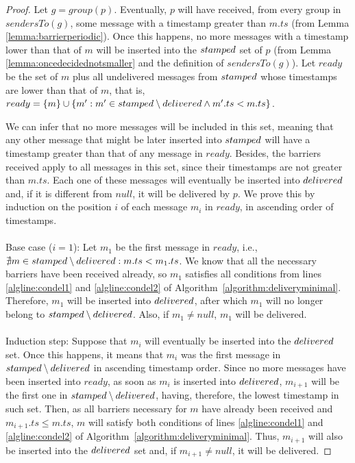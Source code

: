\documentclass[times, 10pt]{article}
\begin{document}
\begin{proof}
Let $g = group(p)$. Eventually, $p$ will have received, from every group in $sendersTo(g)$, some message with a timestamp greater than $m.ts$ (from Lemma \ref{lemma:barrierperiodic}). Once this happens, no more messages with a timestamp lower than that of $m$ will be inserted into the $stamped$ set of $p$ (from Lemma \ref{lemma:oncedecidednotsmaller} and the definition of $sendersTo(g)$). Let $ready$ be the set of $m$ plus all undelivered messages from $stamped$ whose timestamps are lower than that of $m$, that is, $ready = \{m\} \cup \{m' : m' \in stamped \setminus delivered \wedge m'.ts < m.ts\}$.

We can infer that no more messages will be included in this set, meaning that any other message that might be later inserted into $stamped$ will have a timestamp greater than that of any message in $ready$. Besides, the barriers received apply to all messages in this set, since their timestamps are not greater than $m.ts$. Each one of these messages will eventually be inserted into $delivered$ and, if it is different from $null$, it will be delivered by $p$. We prove this by induction on the position $i$ of each message $m_i$ in $ready$, in ascending order of timestamps.\\
\\
\noindent Base case ($i=1$): Let $m_1$ be the first message in $ready$, i.e., \mbox{$\nexists m \in stamped \setminus delivered : m.ts < m_1.ts$}. We know that all the necessary barriers have been received already, so $m_1$ satisfies all conditions from lines \ref{algline:condel1} and \ref{algline:condel2} of \mbox{Algorithm \ref{algorithm:deliveryminimal}}. Therefore, $m_1$ will be inserted into $delivered$, after which $m_1$ will no longer belong to $stamped \setminus delivered$. Also, if $m_1 \neq null$, $m_1$ will be delivered.\\
\\
\noindent Induction step: Suppose that $m_{i}$ will eventually be inserted into the $delivered$ set. Once this happens, it means that $m_{i}$ was the first message in $stamped \setminus delivered$ in ascending timestamp order. Since no more messages have been inserted into $ready$, as soon as $m_{i}$ is inserted into $delivered$, $m_{i+1}$ will be the first one in $stamped \setminus delivered$, having, therefore, the lowest timestamp in such set. Then, as all barriers necessary for $m$ have already been received and $m_{i+1}.ts \leq m.ts$, $m$ will satisfy both conditions of lines \ref{algline:condel1} and \ref{algline:condel2} of \mbox{Algorithm \ref{algorithm:deliveryminimal}}. Thus, $m_{i+1}$ will also be inserted into the $delivered$ set and, if $m_{i+1} \neq null$, it will be delivered.
\end{proof}
\end{document}
